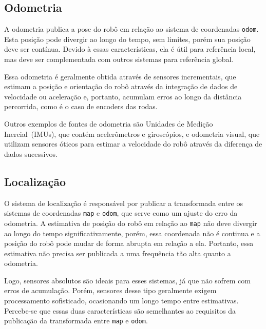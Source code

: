\documentclass[repeatfields,xlists,xpacks,oneside,yearsonly]{ufrgscca}
\begin{document}

\subsection{Odometria}

A odometria publica a pose do robô em relação ao sistema de
coordenadas \texttt{odom}. Esta posição pode divergir ao longo do
tempo, sem limites, porém sua posição deve ser contínua. Devido à
essas características, ela é útil para referência local, mas deve ser
complementada com outros sistemas para referência global.

Essa odometria é geralmente obtida através de sensores incrementais,
que estimam a posição e orientação do robô através da integração de
dados de velocidade ou aceleração e, portanto, acumulam erros ao
longo da distância percorrida, como é o caso de encoders das rodas.

Outros exemplos de fontes de odometria são Unidades de Medição
Inercial~(IMUs), que contém acelerômetros e giroscópios, e odometria
visual, que utilizam sensores óticos para estimar a velocidade do
robô através da diferença de dados sucessivos.


\subsection{Localização}

O sistema de localização é responsável por publicar a transformada
entre os sistemas de coordenadas \texttt{map} e \texttt{odom}, que
serve como um ajuste do erro da odometria. A estimativa de posição do
robô em relação ao \texttt{map} não deve divergir ao longo do tempo
significativamente, porém, essa coordenada não é continua e a posição
do robô pode mudar de forma abrupta em relação a ela. Portanto, essa
estimativa não precisa ser publicada a uma frequência tão alta quanto
a odometria.

Logo, sensores absolutos são ideais para esses sistemas, já que não
sofrem com erros de acumulação. Porém, sensores desse tipo geralmente
exigem processamento sofisticado, ocasionando um longo tempo entre
estimativas. Percebe-se que essas duas características são
semelhantes ao requisitos da publicação da transformada entre
\texttt{map} e \texttt{odom}.
\end{document}
